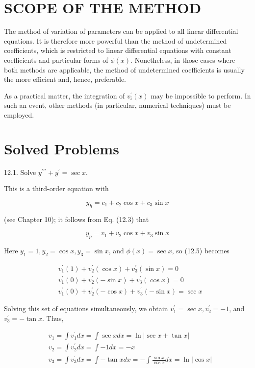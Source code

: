 \documentclass[10pt]{article}
\begin{document}
\section*{SCOPE OF THE METHOD}
The method of variation of parameters can be applied to all linear differential equations. It is therefore more powerful than the method of undetermined coefficients, which is restricted to linear differential equations with constant coefficients and particular forms of $\phi(x)$. Nonetheless, in those cases where both methods are applicable, the method of undetermined coefficients is usually the more efficient and, hence, preferable.

As a practical matter, the integration of $v_{i}^{\prime}(x)$ may be impossible to perform. In such an event, other methods (in particular, numerical techniques) must be employed.

\section*{Solved Problems}
12.1. Solve $y^{\prime \prime \prime}+y^{\prime}=\sec x$.

This is a third-order equation with

$$
y_{h}=c_{1}+c_{2} \cos x+c_{3} \sin x
$$

(see Chapter 10); it follows from Eq. (12.3) that


\begin{equation*}
y_{p}=v_{1}+v_{2} \cos x+v_{3} \sin x \tag{1}
\end{equation*}


Here $y_{1}=1, y_{2}=\cos x, y_{3}=\sin x$, and $\phi(x)=\sec x$, so (12.5) becomes

$$
\begin{aligned}
& v_{1}^{\prime}(1)+v_{2}^{\prime}(\cos x)+v_{3}^{\prime}(\sin x)=0 \\
& v_{1}^{\prime}(0)+v_{2}^{\prime}(-\sin x)+v_{3}^{\prime}(\cos x)=0 \\
& v_{1}^{\prime}(0)+v_{2}^{\prime}(-\cos x)+v_{3}^{\prime}(-\sin x)=\sec x
\end{aligned}
$$

Solving this set of equations simultaneously, we obtain $v_{1}^{\prime}=\sec x, v_{2}^{\prime}=-1$, and $v_{3}^{\prime}=-\tan x$. Thus,

$$
\begin{aligned}
& v_{1}=\int v_{1}^{\prime} d x=\int \sec x d x=\ln |\sec x+\tan x| \\
& v_{2}=\int v_{2}^{\prime} d x=\int-1 d x=-x \\
& v_{3}=\int v_{3}^{\prime} d x=\int-\tan x d x=-\int \frac{\sin x}{\cos x} d x=\ln |\cos x|
\end{aligned}
$$
\end{document}
